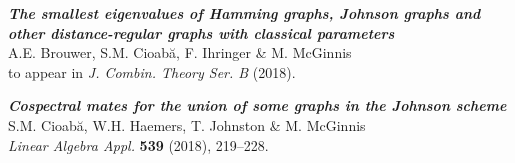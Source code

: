 \vspace*{-12pt}
\begin{cventries}
\cventry
  {}
  {}
  {}
  {}
  {
    \begin{cvitems}
      \item \textbf{\em{The smallest eigenvalues of Hamming graphs, Johnson graphs and other distance-regular graphs with classical parameters}} \\
	    A.E. Brouwer, S.M. Cioab\u{a}, F. Ihringer \& M. McGinnis \\
	    to appear in {\em J. Combin. Theory Ser. B} (2018). 
	    \vspace*{5pt}
      \item \textbf{\em{Cospectral mates for the union of some graphs in the Johnson scheme}} \\
	    S.M. Cioab\u{a}, W.H. Haemers, T. Johnston \& M. McGinnis \\
            {\em Linear Algebra Appl.} {\bf 539} (2018), 219--228.
    \end{cvitems}
  }
\end{cventries}
\vspace*{-2pt}
